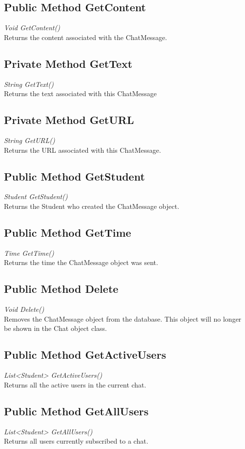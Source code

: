 \documentclass[16pt]{scrreprt}
\begin{document}
\subsection{Public Method GetContent}
\textit{Void GetContent()} \\
Returns the content associated with the ChatMessage.

\subsection{Private Method GetText}
\textit{String GetText()} \\
Returns the text associated with this ChatMessage

\subsection{Private Method GetURL}
\textit{String GetURL()} \\
Returns the URL associated with this ChatMessage.

\subsection{Public Method GetStudent}
\textit{Student GetStudent()} \\
Returns the Student who created the ChatMessage object.

\subsection{Public Method GetTime}
\textit{Time GetTime()} \\
Returns the time the ChatMessage object was sent.

\subsection{Public Method Delete}
\textit{Void Delete()} \\
Removes the ChatMessage object from the database. This object will no longer be shown in the Chat object class.

\subsection{Public Method GetActiveUsers}
\textit{List<Student> GetActiveUsers()} \\
Returns all the active users in the current chat. 

\subsection{Public Method GetAllUsers}
\textit{List<Student> GetAllUsers()} \\
Returns all users currently subscribed to a chat. 
\end{document}

